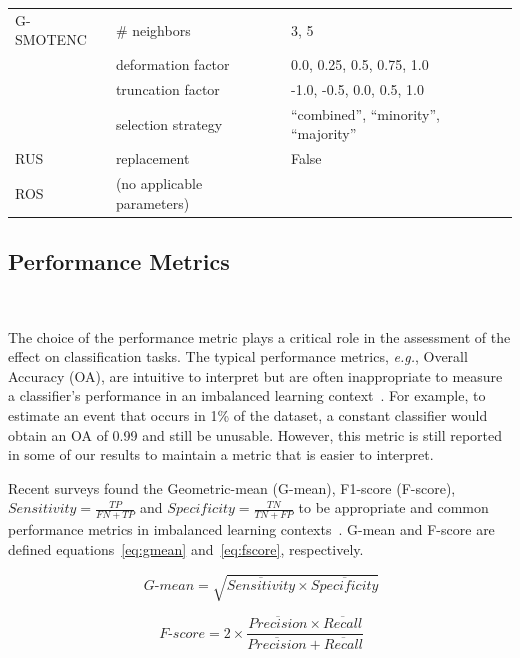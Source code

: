 \documentclass[preprint,12pt]{elsarticle}
\begin{document}
{\begin{table}[ht]
\begin{tabular}{lll}
		G-SMOTENC       & \# neighbors                     & 3, 5                           \\
                        & deformation factor               & 0.0, 0.25, 0.5, 0.75, 1.0      \\
                        & truncation factor                & -1.0, -0.5, 0.0, 0.5, 1.0      \\
                        & selection strategy               & ``combined'',
                        ``minority'', ``majority''\\
		RUS             & replacement                      & False                          \\
		ROS             & (no applicable parameters)       &                                \\
		\bottomrule
	\end{tabular}
\end{table}

\subsection{Performance Metrics}~\label{sec:performance_metrics}

The choice of the performance metric plays a critical role in the assessment
of the effect on classification tasks. The typical performance metrics,
\textit{e.g.}, Overall Accuracy (OA), are intuitive to interpret but are often
inappropriate to measure a classifier's performance in an imbalanced learning
context~\cite{sun2009classification}. For example, to estimate an event that
occurs in 1\% of the dataset, a constant classifier would obtain an OA of 0.99
and still be unusable. However, this metric is still reported in some of our
results to maintain a metric that is easier to interpret.

Recent surveys found the Geometric-mean (G-mean), F1-score
(F-score), $Sensitivity = \frac{TP}{FN+TP}$ and $Specificity = \frac{TN}{TN +
FP}$ to be appropriate and common performance metrics in imbalanced learning
contexts~\cite{rout2018handling, jeni2013facing,
japkowicz2013assessment}. G-mean and F-score are defined
equations~\ref{eq:gmean} and~\ref{eq:fscore}, respectively.

\begin{equation}~\label{eq:gmean}
    \ensuremath{\textit{G-mean}} = \sqrt{\overline{Sensitivity} \times
    \overline{Specificity}}
\end{equation}

\begin{equation}~\label{eq:fscore}
    \ensuremath{\textit{F-score}} = 2\times\frac{\overline{Precision} \times
    \overline{Recall}}{\overline{Precision} + \overline{Recall}}
\end{equation}

}
\end{document}
